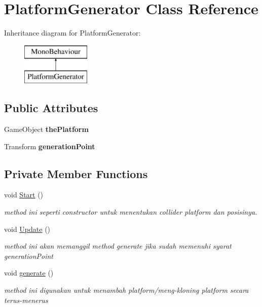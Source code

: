 \hypertarget{class_platform_generator}{}\section{Platform\+Generator Class Reference}
\label{class_platform_generator}
Inheritance diagram for Platform\+Generator\+:\begin{figure}[H]
\begin{center}
\leavevmode
\includegraphics[height=2.000000cm]{class_platform_generator}
\end{center}
\end{figure}
\subsection*{Public Attributes}
\begin{DoxyCompactItemize}
\item 
\hypertarget{class_platform_generator_aa8fe8501862e7e300c00d59e57586a47}{}\label{class_platform_generator_aa8fe8501862e7e300c00d59e57586a47} 
Game\+Object {\bfseries the\+Platform}
\item 
\hypertarget{class_platform_generator_aad78bda099715573856e053b41a355fc}{}\label{class_platform_generator_aad78bda099715573856e053b41a355fc} 
Transform {\bfseries generation\+Point}
\end{DoxyCompactItemize}
\subsection*{Private Member Functions}
\begin{DoxyCompactItemize}
\item 
void \hyperlink{class_platform_generator_a4a9f8f525415c599d761c8371734619d}{Start} ()
\begin{DoxyCompactList}\small\item\em method ini seperti constructor untuk menentukan collider platform dan posisinya. \end{DoxyCompactList}\item 
void \hyperlink{class_platform_generator_a8e50d153f28945c3755b9d9bfb2fde9a}{Update} ()
\begin{DoxyCompactList}\small\item\em method ini akan memanggil method generate jika sudah memenuhi syarat generation\+Point \end{DoxyCompactList}\item 
void \hyperlink{class_platform_generator_aa6c531bd8acd0de80999c4033e4f0a8e}{generate} ()
\begin{DoxyCompactList}\small\item\em method ini digunakan untuk menambah platform/meng-\/kloning platform secara terus-\/menerus \end{DoxyCompactList}\end{DoxyCompactItemize}
